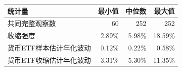 \begin{tabular}{lrrr}
\toprule
统计量 & 最小值 & 中位数 & 最大值\\\midrule
共同完整观察数 & 60 & 252 & 252\\
收缩强度 & 2.89\% & 5.98\% & 18.59\%\\
货币ETF样本估计年化波动 & 0.12\% & 0.22\% & 0.58\%\\
货币ETF收缩估计年化波动 & 3.31\% & 5.30\% & 11.35\%\\
\bottomrule
\end{tabular}